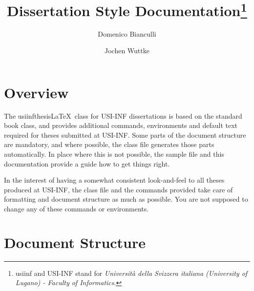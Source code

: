 \documentclass{article}
\author{ Domenico Bianculli \and Jochen Wuttke}
\title{\clsusiinf Dissertation Style
  Documentation\footnote{\textsf{usiinf} and USI-INF
  stand for \emph{Universit\`a della Svizzera italiana (University of
    Lugano) - Faculty of Informatics}.}}
\newcommand{\clsusiinf}{\textsf{usiinfthesis}\xspace}
\begin{document}
\maketitle

\section{Overview}

The \clsusiinf\LaTeX\ class for USI-INF dissertations is based on the standard
\textsf{book} class, and provides additional commands, environments
and default text required for theses submitted at USI-INF.
Some parts of the document structure are mandatory, and where
possible, the class file generates those parts automatically. In place
where this is not possible, the sample file and this documentation
provide a guide how to get things right.

In the interest of having a somewhat consistent look-and-feel to all
theses produced at USI-INF, the class file and the commands
provided take care of formatting and document structure as much as
possible. You are not supposed to change any of these commands or
environments. 

\section{Document Structure}
\end{document}
